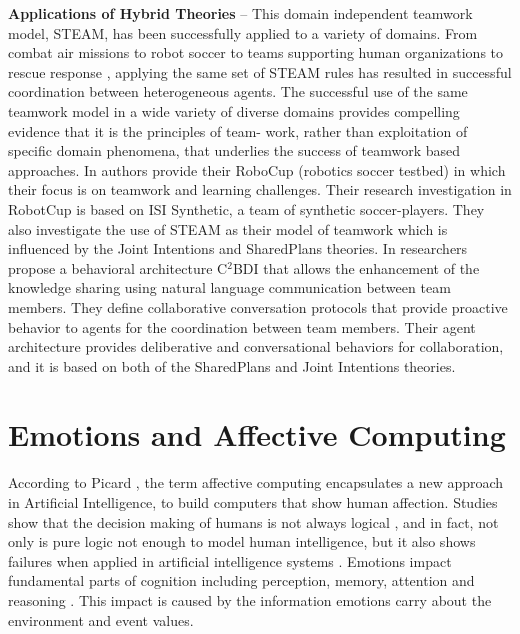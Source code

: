 \documentclass[12pt]{report}
\begin{document}
\textbf{Applications of Hybrid Theories} -- This domain independent teamwork
model, STEAM, has been successfully applied to a variety of domains.  From
combat air missions \cite{hill:synthetic-battlefield-aircraft} to robot soccer
\cite{kitano:robocup} to teams supporting human organizations
\cite{pynadath:teamwork-heterogeneous-agents} to rescue response
\cite{scerri:robot-agent-person}, applying the same set of STEAM rules has
resulted in successful coordination between heterogeneous agents. The successful
use of the same teamwork model in a wide variety of diverse domains provides
compelling evidence that it is the principles of team- work, rather than
exploitation of specific domain phenomena, that underlies the success of
teamwork based approaches. In \cite{marsella:robocup} authors provide their
RoboCup (robotics soccer testbed) in which their focus is on teamwork and
learning challenges. Their research investigation in RobotCup is based on ISI
Synthetic, a team of synthetic soccer-players. They also investigate the use of
STEAM as their model of teamwork which is influenced by the Joint Intentions and
SharedPlans theories. In \cite{kabil:coordination-mechanisms} researchers
propose a behavioral architecture C$^2$BDI that allows the enhancement of the
knowledge sharing using natural language communication between team members.
They define collaborative conversation protocols that provide proactive behavior
to agents for the coordination between team members. Their agent architecture
provides deliberative and conversational behaviors for collaboration, and it is
based on both of the SharedPlans and Joint Intentions theories.

\section{Emotions and Affective Computing}
According to Picard \cite{picard:affective-computing}, the term affective
computing encapsulates a new approach in Artificial Intelligence, to build
computers that show human affection. Studies show that the decision making of
humans is not always logical \cite{GrossbergGutowski:affect-cognition}, and in
fact, not only is pure logic not enough to model human intelligence, but it also
shows failures when applied in artificial intelligence systems
\cite{dreyfus:artificial-critique}. Emotions impact fundamental parts of
cognition including perception, memory, attention and reasoning
\cite{clore:judgement-regulation}. This impact is caused by the information
emotions carry about the environment and event values.
\end{document}
